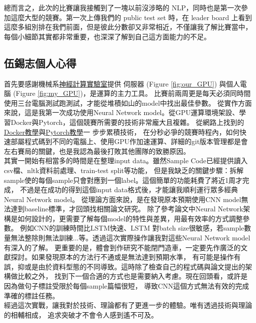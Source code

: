 \documentclass[8pt,a4paper]{article}
\begin{document}
總而言之，此次的比賽讓我接觸到了一塊以前沒涉略的 NLP，同時也是第一次參加這麼大型的競賽。第一次上傳我們的 public test set 時，在 leader board 上看到這麼多組別排在我們前面，但是彼此分數卻又非常相近，不僅讓我了解比賽當中，每個小細節其實都非常重要，也深深了解到自己這方面能力的不足。\\


\subsection*{伍錫志個人心得}

首先要感謝機械系\href{https://nckunclab.wixsite.com/neuralcomputationlab}{神經計算實驗室}提供
伺服器 (Figure \ref{fig:our_GPU}) 與個人電腦 (Figure \ref{fig:my_GPU})，是運算的主力工具。
比賽前兩周更是每天必須同時間使用三台電腦測試跑測試，才能從堆積如山的model中找出最佳參數。
從實作方面來說，這是我第一次成功使用Neural Network model。從GPU運算環境架設、學習Docker與Pytorch，這個競賽所需要的技術非常龐大且複雜。
從網路上找到的\href{https://www.tensorflow.org/install/docker}{Docker教學}與\href{https://github.com/zergtant/pytorch-handbook}{Pytorch教學}一
步步累積技術，
在分秒必爭的競賽時程內，如何快速部屬程式碼到不同的電腦上、使用GPU作加速運算、詳細的git版本管理都是會左右賽局的關鍵，也是我認為最後打敗其他團隊的致勝原因。\\

其實一開始有相當多的時間是在整理input data。雖然Sample Code已經提供讀入csv檔、nltk資料前處理、train-test split等功能，
但是我缺乏的關鍵步驟：拆解sample使的每個sample只會對應到一個label。這個簡單的功能耗費了將近1周才完成，
不過是在成功的得到這個input data格式後，才能讓我順利運行眾多經典Neural Network model。
從理論方面來說，是在發現原本預期使用CNN model無法達到baseline標準，才回頭找相關論文研究。
除了參考論文中Neural Network架構是如何設計的，更需要了解每個model的特性與差異，用最有效率的方式調整參數。
例如CNN的訓練時間比LSTM快速、LSTM 對batch size很敏感，若sample數量無法整除則無法訓練...等。透過這次實際操作讓我對這些Neural Network model有深入的了解。
更重要的是，體會到作研究不能閉門造車，一定要先作廣泛的文獻探討。如果發現原本的方法行不通或是無法達到預期水準，
有可能是操作有誤，抑或是由於資料型態的不同導致。這時除了檢查自己的程式碼與論文提出的架構做比較之外，
找到下一個合適的方式也是需要納入考慮。現在回頭看，或許是因為做句子標註受限於每個sample篇幅很短，
導致CNN這個方式無法有效的完成準確的標註任務。\\

經過這次實戰，讓我對於技術、理論都有了更進一步的體驗。唯有透過技術與理論的相輔相成，
追求突破才不會令人感到遙不可及。
\end{document}
